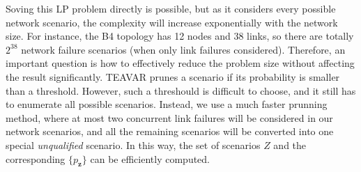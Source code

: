 \documentclass[sigconf]{acmart}
\begin{document}

Soving this LP problem directly is possible, but as it considers every possible network scenario, 
the complexity will increase exponentially with the network size.
For instance, the B4 topology \cite{B4} has 12 nodes and 38 links,
so there are totally $2^{38}$ network failure scenarios (when only link failures considered).
Therefore, an important question is how to effectively reduce the problem size without 
affecting the result significantly. TEAVAR \cite{Teavar} prunes a scenario if its probability is smaller than a threshold. However, such a threshould is difficult to choose, and it still has to enumerate all 
possible scenarios. Instead, we use a much faster prunning method, 
where at most two concurrent link failures will be considered in our network scenarios, 
and all the remaining scenarios will be converted into one special \textit{unqualified} scenario. 
In this way, the set of scenarios $Z$ and the corresponding $\{p_\mathbf{z}\}$ can be efficiently computed. 
\end{document}
